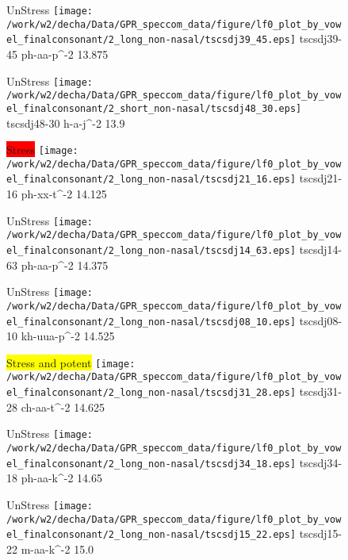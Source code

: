 \documentclass{article}
\begin{document}
\begin{figure}[t]
\begin{minipage}[b]{.24\textwidth}
UnStress
\centering
\texttt{[image: /work/w2/decha/Data/GPR\_speccom\_data/figure/lf0\_plot\_by\_vowel\_finalconsonant/2\_long\_non-nasal/tscsdj39\_45.eps]}
tscsdj39-45 ph-aa-p\textasciicircum-2 13.875
\end{minipage}
\begin{minipage}[b]{.24\textwidth}
UnStress
\centering
\texttt{[image: /work/w2/decha/Data/GPR\_speccom\_data/figure/lf0\_plot\_by\_vowel\_finalconsonant/2\_short\_non-nasal/tscsdj48\_30.eps]}
tscsdj48-30 h-a-j\textasciicircum-2 13.9
\end{minipage}
\begin{minipage}[b]{.24\textwidth}
\colorbox{red}{Stress}
\centering
\texttt{[image: /work/w2/decha/Data/GPR\_speccom\_data/figure/lf0\_plot\_by\_vowel\_finalconsonant/2\_long\_non-nasal/tscsdj21\_16.eps]}
tscsdj21-16 ph-xx-t\textasciicircum-2 14.125
\end{minipage}
\begin{minipage}[b]{.24\textwidth}
UnStress
\centering
\texttt{[image: /work/w2/decha/Data/GPR\_speccom\_data/figure/lf0\_plot\_by\_vowel\_finalconsonant/2\_long\_non-nasal/tscsdj14\_63.eps]}
tscsdj14-63 ph-aa-p\textasciicircum-2 14.375
\end{minipage}
\end{figure}

\begin{figure}[t]
\begin{minipage}[b]{.24\textwidth}
UnStress
\centering
\texttt{[image: /work/w2/decha/Data/GPR\_speccom\_data/figure/lf0\_plot\_by\_vowel\_finalconsonant/2\_long\_non-nasal/tscsdj08\_10.eps]}
tscsdj08-10 kh-uua-p\textasciicircum-2 14.525
\end{minipage}
\begin{minipage}[b]{.24\textwidth}
\colorbox{yellow}{Stress and potent}
\centering
\texttt{[image: /work/w2/decha/Data/GPR\_speccom\_data/figure/lf0\_plot\_by\_vowel\_finalconsonant/2\_long\_non-nasal/tscsdj31\_28.eps]}
tscsdj31-28 ch-aa-t\textasciicircum-2 14.625
\end{minipage}
\begin{minipage}[b]{.24\textwidth}
UnStress
\centering
\texttt{[image: /work/w2/decha/Data/GPR\_speccom\_data/figure/lf0\_plot\_by\_vowel\_finalconsonant/2\_long\_non-nasal/tscsdj34\_18.eps]}
tscsdj34-18 ph-aa-k\textasciicircum-2 14.65
\end{minipage}
\begin{minipage}[b]{.24\textwidth}
UnStress
\centering
\texttt{[image: /work/w2/decha/Data/GPR\_speccom\_data/figure/lf0\_plot\_by\_vowel\_finalconsonant/2\_long\_non-nasal/tscsdj15\_22.eps]}
tscsdj15-22 m-aa-k\textasciicircum-2 15.0
\end{minipage}
\end{figure}
\end{document}
